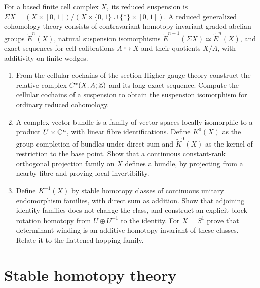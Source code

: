 \begin{exercise}
For a based finite cell complex $X$, its reduced suspension is
$\Sigma X=(X\times[0,1])/(X\times\{0,1\}\cup\{*\}\times[0,1])$.
A reduced generalized cohomology theory consists of contravariant
homotopy-invariant graded abelian groups $\widetilde E^n(X)$,
natural suspension isomorphisms
$\widetilde E^{n+1}(\Sigma X)\simeq\widetilde E^n(X)$,
and exact sequences for cell cofibrations $A\hookrightarrow X$
and their quotients $X/A$, with additivity on finite wedges.
\begin{enumerate}[label=(\alph*)]
\item From the cellular cochains of the section Higher gauge
theory construct the relative complex $C^*(X,A;\mathbb Z)$ and its
long exact sequence. Compute the cellular cochains of a
suspension to obtain the suspension isomorphism for ordinary
reduced cohomology.
\item A complex vector bundle is a family of vector spaces
locally isomorphic to a product $U\times\mathbb C^n$, with linear
fibre identifications. Define $K^0(X)$ as the group completion
of bundles under direct sum and $\widetilde K^0(X)$ as the
kernel of restriction to the base point. Show that a continuous
constant-rank orthogonal projection family on $X$ defines a
bundle, by projecting from a nearby fibre and proving local
invertibility.
\item Define $K^{-1}(X)$ by stable homotopy classes of continuous
unitary endomorphism families, with direct sum as addition.
Show that adjoining identity families does not change the
class, and construct an explicit block-rotation homotopy from
$U\oplus U^{-1}$ to the identity. For $X=S^1$ prove that
determinant winding is an additive homotopy invariant of these
classes. Relate it to the flattened hopping family.
\end{enumerate}
\end{exercise}

\section{Stable homotopy theory}

